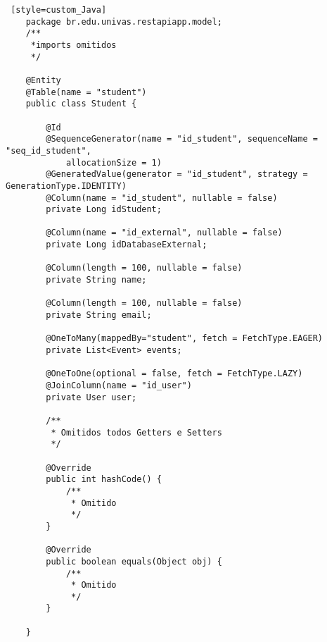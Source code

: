 \begin{lstlisting} [style=custom_Java]	
	package br.edu.univas.restapiapp.model;
	/**
	 *imports omitidos
	 */
	
	@Entity
	@Table(name = "student")
	public class Student {
	
		@Id
		@SequenceGenerator(name = "id_student", sequenceName = "seq_id_student",
			allocationSize = 1) 
		@GeneratedValue(generator = "id_student", strategy = GenerationType.IDENTITY)
		@Column(name = "id_student", nullable = false)
		private Long idStudent;
	
		@Column(name = "id_external", nullable = false)
		private Long idDatabaseExternal;
	
		@Column(length = 100, nullable = false)
		private String name;
	
		@Column(length = 100, nullable = false)
		private String email;
	
		@OneToMany(mappedBy="student", fetch = FetchType.EAGER)
		private List<Event> events;
	
		@OneToOne(optional = false, fetch = FetchType.LAZY)
		@JoinColumn(name = "id_user")
		private User user;
	
		/**
		 * Omitidos todos Getters e Setters
		 */
	
		@Override
		public int hashCode() {
			/**
			 * Omitido
			 */
		}
	
		@Override
		public boolean equals(Object obj) {
			/**
			 * Omitido
			 */
		}
	
	}
\end{lstlisting}